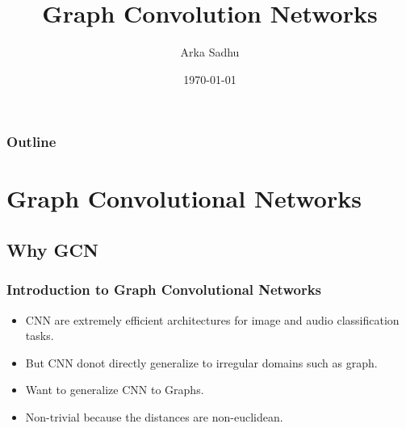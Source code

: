 \documentclass{beamer}
\title{Graph Convolution Networks}
\author{Arka Sadhu}
\institute{IIT Bombay}
\date{\today}
\begin{document}


\begin{frame}
\titlepage
\end{frame}

\begin{frame}
\frametitle{Outline}
\tableofcontents
\end{frame}

\section{Graph Convolutional Networks}

\subsection{Why GCN}
\begin{frame}
  \frametitle{Introduction to Graph Convolutional Networks}
  \begin{itemize}
  \item <1-> CNN are extremely efficient architectures for image and audio classification tasks.
  \item <1-> But CNN donot directly generalize to irregular domains such as graph.
  \item <2-> Want to generalize CNN to Graphs.
  \item <3-> Non-trivial because the distances are non-euclidean.
  \end{itemize}
\end{frame}
\end{document}
